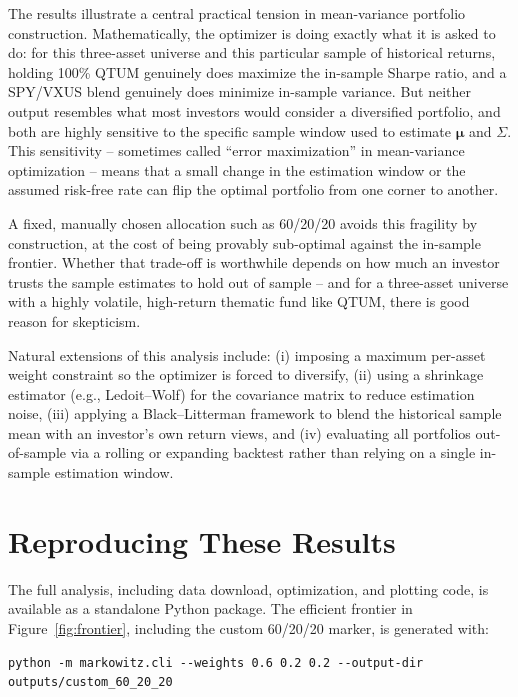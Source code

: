 \documentclass[11pt]{article}
\begin{document}
The results illustrate a central practical tension in mean-variance
portfolio construction. Mathematically, the optimizer is doing exactly what
it is asked to do: for this three-asset universe and this particular sample
of historical returns, holding 100\% QTUM genuinely does maximize the
in-sample Sharpe ratio, and a SPY/VXUS blend genuinely does minimize
in-sample variance. But neither output resembles what most investors would
consider a diversified portfolio, and both are highly sensitive to the
specific sample window used to estimate $\boldsymbol{\mu}$ and $\Sigma$.
This sensitivity -- sometimes called ``error maximization'' in mean-variance
optimization \citep*{michaud1989} -- means that a small change in the
estimation window or the assumed risk-free rate can flip the optimal
portfolio from one corner to another.

A fixed, manually chosen allocation such as 60/20/20 avoids this fragility
by construction, at the cost of being provably sub-optimal against the
in-sample frontier. Whether that trade-off is worthwhile depends on how
much an investor trusts the sample estimates to hold out of sample -- and
for a three-asset universe with a highly volatile, high-return thematic
fund like QTUM, there is good reason for skepticism.

Natural extensions of this analysis include: (i) imposing a maximum
per-asset weight constraint so the optimizer is forced to diversify, (ii)
using a shrinkage estimator (e.g., Ledoit--Wolf) for the covariance matrix
to reduce estimation noise, (iii) applying a Black--Litterman framework to
blend the historical sample mean with an investor's own return views, and
(iv) evaluating all portfolios out-of-sample via a rolling or expanding
backtest rather than relying on a single in-sample estimation window.

\appendix

\section{Reproducing These Results}

The full analysis, including data download, optimization, and plotting
code, is available as a standalone Python package. The efficient frontier
in Figure~\ref{fig:frontier}, including the custom 60/20/20 marker, is
generated with:

\begin{lstlisting}[style=python, numbers=none]
python -m markowitz.cli --weights 0.6 0.2 0.2 --output-dir outputs/custom_60_20_20
\end{lstlisting}
\end{document}
